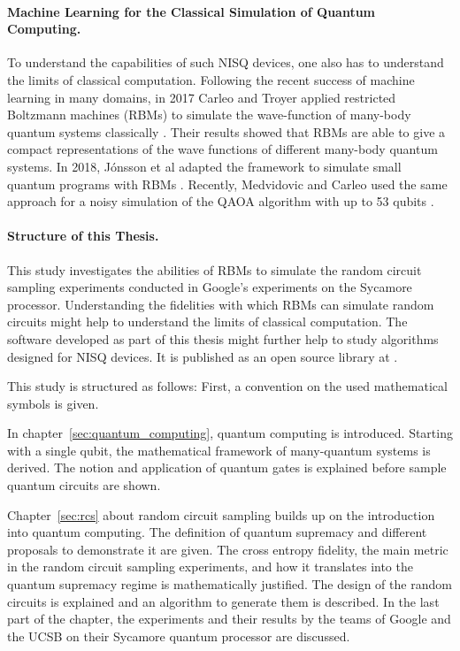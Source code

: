 \paragraph{Machine Learning for the Classical Simulation of Quantum Computing.}
To understand the capabilities of such NISQ devices, one also has to understand 
the limits of classical computation. Following the recent success of machine learning in 
many domains, in 2017 Carleo and Troyer applied restricted Boltzmann machines (RBMs)
to simulate the wave-function of many-body quantum systems classically \cite{carleo2017solving}.
Their results showed that RBMs are able to give a compact representations of the wave functions 
of different many-body quantum systems. In 2018, 
J\'{o}nsson et al adapted the framework to simulate small quantum programs with 
RBMs \cite{jnsson2018neuralnetwork}. Recently, Medvidovic and Carleo used the 
same approach for a noisy simulation of the QAOA algorithm with up to 53 qubits \cite{medvidovic2020classical}.

\paragraph{Structure of this Thesis.}
This study investigates the abilities of RBMs to simulate the random circuit sampling 
experiments conducted in Google's experiments on the Sycamore processor. Understanding the
fidelities with which RBMs can simulate random circuits might help to understand
the limits of classical computation. The software developed as part of this thesis 
might further help to study algorithms designed for NISQ devices. It is published as 
an open source library at \cite{NQS2020}.

This study is structured as follows: First, a convention on the used mathematical 
symbols is given.

In chapter~\ref{sec:quantum_computing}, quantum computing is introduced. Starting with a single qubit,
the mathematical framework of many-quantum systems is derived. The notion and application 
of quantum gates is explained before sample quantum circuits are shown.

Chapter~\ref{sec:rcs} about random circuit sampling builds up on the introduction into quantum computing.
The definition of quantum supremacy and different proposals to demonstrate it are given. The 
cross entropy fidelity, the main metric in the random circuit sampling experiments, and how 
it translates into the quantum supremacy regime is mathematically justified. The design of 
the random circuits is explained and an algorithm to generate them is described. In the last
part of the chapter, the experiments and their results by the teams of Google and the UCSB on 
their Sycamore quantum processor are discussed.

